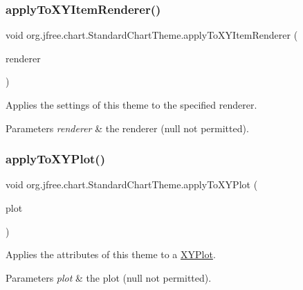 \subsubsection{\texorpdfstring{apply\+To\+X\+Y\+Item\+Renderer()}{applyToXYItemRenderer()}}
{\footnotesize\ttfamily void org.\+jfree.\+chart.\+Standard\+Chart\+Theme.\+apply\+To\+X\+Y\+Item\+Renderer (\begin{DoxyParamCaption}\item[{\mbox{\hyperlink{interfaceorg_1_1jfree_1_1chart_1_1renderer_1_1xy_1_1_x_y_item_renderer}{X\+Y\+Item\+Renderer}}}]{renderer }\end{DoxyParamCaption})\hspace{0.3cm}{\ttfamily [protected]}}

Applies the settings of this theme to the specified renderer.


\begin{DoxyParams}{Parameters}
{\em renderer} & the renderer ({\ttfamily null} not permitted). \\
\hline
\end{DoxyParams}
\mbox{\label{classorg_1_1jfree_1_1chart_1_1_standard_chart_theme_a003c5f22c4ae3f1a4bf8196acdf4cb1b}} 
\subsubsection{\texorpdfstring{apply\+To\+X\+Y\+Plot()}{applyToXYPlot()}}
{\footnotesize\ttfamily void org.\+jfree.\+chart.\+Standard\+Chart\+Theme.\+apply\+To\+X\+Y\+Plot (\begin{DoxyParamCaption}\item[{\mbox{\hyperlink{classorg_1_1jfree_1_1chart_1_1plot_1_1_x_y_plot}{X\+Y\+Plot}}}]{plot }\end{DoxyParamCaption})\hspace{0.3cm}{\ttfamily [protected]}}

Applies the attributes of this theme to a \mbox{\hyperlink{}{X\+Y\+Plot}}.


\begin{DoxyParams}{Parameters}
{\em plot} & the plot ({\ttfamily null} not permitted). \\
\hline
\end{DoxyParams}
\mbox{\label{classorg_1_1jfree_1_1chart_1_1_standard_chart_theme_a6227dbed3c6316535e8aaabfea9c76f9}} 
